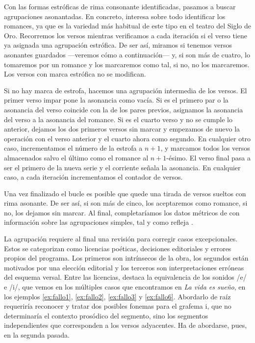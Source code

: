 Con las formas estróficas de rima consonante identificadas, pasamos a buscar agrupaciones asonantadas. En concreto, interesa sobre todo identificar los romances, ya que es la variedad más habitual de este tipo en el teatro del Siglo de Oro. Recorremos los versos mientras verificamos a cada iteración si el verso tiene ya asignada una agrupación estrófica. De ser así, miramos si tenemos versos asonantes guardados —veremos cómo a continuación— y, si son más de cuatro, lo tomaremos por un romance y los marcaremos como tal, si no, no los marcaremos. Los versos con marca estrófica no se modifican.



Si no hay marca de estrofa, hacemos una agrupación intermedia de los versos. El primer verso impar pone la asonancia como vacía. Si es el primero par o la asonancia del verso coincide con la de los pares previos, asignamos la asonancia del verso a la asonancia del romance. Si es el cuarto verso y no se cumple lo anterior, dejamos los dos primeros versos sin marcar y empezamos de nuevo la operación con el verso anterior y el cuarto ahora como segundo. En cualquier otro caso, incrementamos el número de la estrofa a $n+1$, y marcamos todos los versos almacenados salvo el último como el romance al $n+1$-ésimo. El verso final pasa a ser el primero de la nueva serie y el corriente señala la asonancia. En cualquier caso, a cada iteración incrementamos el contador de versos.

Una vez finalizado el bucle es posible que quede una tirada de versos sueltos con rima asonante. De ser así, si son más de cinco, los aceptaremos como romance, si no, los dejamos sin marcar. Al final, completaríamos los datos métricos de  con información sobre las agrupaciones simples, tal y como refleja .

La agrupación requiere al final una revisión para corregir casos excepcionales. Estos se categorizan como licencias poéticas, decisiones editoriales y errores propios del programa. Los primeros son intrínsecos de la obra, los segundos están motivados por una elección editorial y los terceros son interpretaciones erróneas del esquema versal. Entre las licencias, destaca la equivalencia de los sonidos /e/ e /i/, que vemos en los múltiples casos que encontramos en \textit{La vida es sueño}, en los ejemplos \ref{ex:fallo1}, \ref{ex:fallo2}, \ref{ex:fallo3} y 
\ref{ex:fallo6}. Abordarlo de raíz requeriría reconocer y tratar dos posibles fonemas para el grafema \textlangle i\textrangle, que no determinaría el contexto prosódico del segmento, sino los segmentos independientes  que corresponden a los versos adyacentes. Ha de abordarse, pues, en la segunda pasada.

